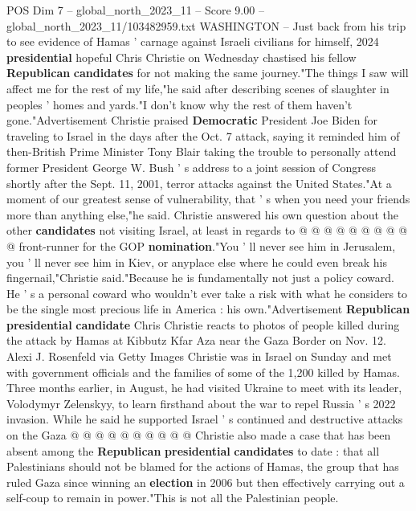 \begin{textsample}{POS Dim 7 – global\_north\_2023\_11 – Score 9.00 – global\_north\_2023\_11/103482959.txt}  \label{ex:f7_pos_132}
WASHINGTON -- Just back from his trip to see evidence of Hamas ' carnage against Israeli civilians for himself, 2024 \textbf{presidential} hopeful Chris Christie on Wednesday chastised his fellow \textbf{Republican} \textbf{candidates} for not making the same journey."The things I saw will affect me for the rest of my life,"he said after describing scenes of slaughter in peoples ' homes and yards."I don't know why the rest of them haven't gone."Advertisement Christie praised \textbf{Democratic} President Joe Biden for traveling to Israel in the days after the Oct. 7 attack, saying it reminded him of then-British Prime Minister Tony Blair taking the trouble to personally attend former President George W.
Bush ' s address to a joint session of Congress shortly after the Sept. 11, 2001, terror attacks against the United States."At a moment of our greatest sense of vulnerability, that ' s when you need your friends more than anything else,"he said.
Christie answered his own question about the other \textbf{candidates} not visiting Israel, at least in regards to @ @ @ @ @ @ @ @ @ @ front-runner for the GOP \textbf{nomination}."You ' ll never see him in Jerusalem, you ' ll never see him in Kiev, or anyplace else where he could even break his fingernail,"Christie said."Because he is fundamentally not just a policy coward.
He ' s a personal coward who wouldn't ever take a risk with what he considers to be the single most precious life in America : his own."Advertisement \textbf{Republican} \textbf{presidential} \textbf{candidate} Chris Christie reacts to photos of people killed during the attack by Hamas at Kibbutz Kfar Aza near the Gaza Border on Nov. 12.
Alexi J.
Rosenfeld via Getty Images Christie was in Israel on Sunday and met with government officials and the families of some of the 1,200 killed by Hamas.
Three months earlier, in August, he had visited Ukraine to meet with its leader, Volodymyr Zelenskyy, to learn firsthand about the war to repel Russia ' s 2022 invasion.
While he said he supported Israel ' s continued and destructive attacks on the Gaza @ @ @ @ @ @ @ @ @ @ Christie also made a case that has been absent among the \textbf{Republican} \textbf{presidential} \textbf{candidates} to date : that all Palestinians should not be blamed for the actions of Hamas, the group that has ruled Gaza since winning an \textbf{election} in 2006 but then effectively carrying out a self-coup to remain in power."This is not all the Palestinian people.

\end{textsample}
